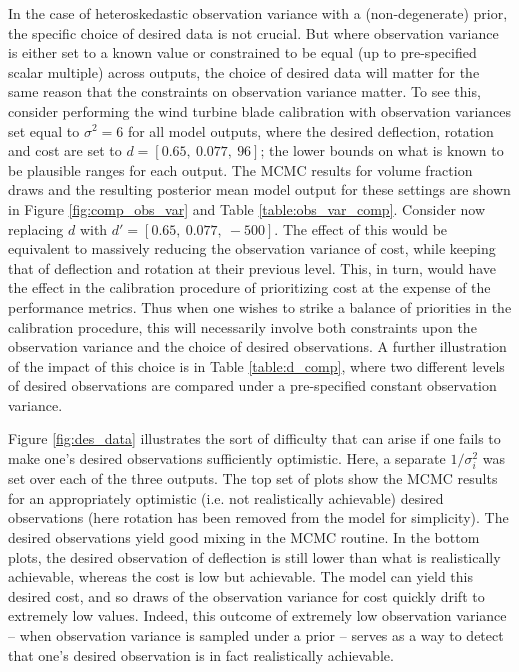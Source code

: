 \documentclass{article}
\begin{document}
In the case of heteroskedastic observation variance with a (non-degenerate) prior, the specific choice of desired data is not crucial. But where observation variance is either set to a known value or constrained to be equal (up to pre-specified scalar multiple) across outputs, the choice of desired data will matter for the same reason that the constraints on observation variance matter. To see this, consider performing the wind turbine blade calibration with observation variances set equal to $\sigma^2=6$ for all model outputs, where the desired deflection, rotation and cost are set to $d=[0.65,\ 0.077,\ 96]$; the lower bounds on what is known to be plausible ranges for each output. The MCMC results for volume fraction draws and the resulting posterior mean model output for these settings are shown in Figure \ref{fig:comp_obs_var} and Table \ref{table:obs_var_comp}. Consider now replacing $d$ with $d'=[0.65,\ 0.077,\ -500]$. The effect of this would be equivalent to massively reducing the observation variance of cost, while keeping that of deflection and rotation at their previous level. This, in turn, would have the effect in the calibration procedure of prioritizing cost at the expense of the performance metrics. Thus when one wishes to strike a balance of priorities in the calibration procedure, this will necessarily involve both constraints upon the observation variance and the choice of desired observations. A further illustration of the impact of this choice is in Table \ref{table:d_comp}, where two different levels of desired observations are compared under a pre-specified constant observation variance.

Figure \ref{fig:des_data} illustrates the sort of difficulty that can arise if one fails to make one's desired observations sufficiently optimistic. Here, a separate $1/\sigma^2_i$ was set over each of the three outputs. The top set of plots show the MCMC results for an appropriately optimistic (i.e. not realistically achievable) desired observations (here rotation has been removed from the model for simplicity). The desired observations yield good mixing in the MCMC routine. In the bottom plots, the desired observation of deflection is still lower than what is realistically achievable, whereas the cost is low but achievable. The model can yield this desired cost, and so draws of the observation variance for cost quickly drift to extremely low values. Indeed, this outcome of extremely low observation variance -- when observation variance is sampled under a prior -- serves as a way to detect that one's desired observation is in fact realistically achievable.
\end{document}
